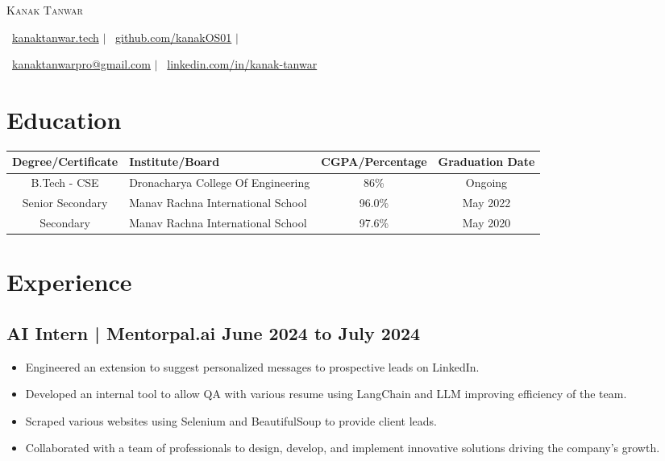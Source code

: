 \documentclass[a4paper,11pt]{article}
\begin{document}
\pagestyle{empty} %

\vspace{-10mm}
\begin{center}
    {\Huge\scshape Kanak Tanwar}
    
    \vspace{0.01em}
    \faGlobe\ \href{https://kanaktanwar.tech}{kanaktanwar.tech} $\vert$
    \faGithub\ \href{https://github.com/kanakOS01}{github.com/kanakOS01} $\vert$
    
    \faEnvelope\ \href{mailto:kanaktanwarpro@gmail.com}{kanaktanwarpro@gmail.com} $\vert$
    \faLinkedin\ \href{https://www.linkedin.com/in/kanak-tanwar/}{linkedin.com/in/kanak-tanwar}
\end{center} 
\vspace{-5mm}

\section{Education}
\vspace{-2mm}
    \setlength{\tabcolsep}{2pt} %
    \small\begin{tabularx}{\textwidth}{|c|Y|c|c|}
      \hline
      \textbf{Degree/Certificate} & \textbf{Institute/Board} & \textbf{CGPA/Percentage} & \textbf{Graduation Date}\\
      \hline
      B.Tech - CSE & Dronacharya College Of Engineering & 86\% & Ongoing\\
      \hline
      Senior Secondary & Manav Rachna International School & 96.0\% & May 2022 \\
      \hline
      Secondary & Manav Rachna International School & 97.6\% & May 2020 \\
      \hline
    \end{tabularx}
\vspace{-5mm}

\section*{Experience}
\vspace{-2mm}
\subsection{AI Intern | Mentorpal.ai 
\hfill June 2024 to July 2024}
\begin{itemize}[itemsep=0pt,parsep=0pt,topsep=0pt,partopsep=0pt]
    \item Engineered an extension to suggest personalized messages to prospective leads on LinkedIn.
    \item Developed an internal tool to allow QA with various resume using LangChain and LLM improving efficiency of the team.
    \item Scraped various websites using Selenium and BeautifulSoup to provide client leads.
    \item Collaborated with a team of professionals to design, develop, and implement innovative solutions driving the company’s growth.
\end{itemize}
\vspace{-5mm}
\end{document}
